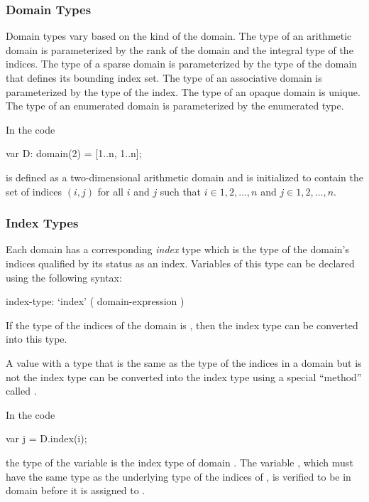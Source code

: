 \subsubsection{Domain Types}
\label{Domain_Types}

Domain types vary based on the kind of the domain.  The type of an
arithmetic domain is parameterized by the rank of the domain and the
integral type of the indices.  The type of a sparse domain is
parameterized by the type of the domain that defines its bounding
index set.  The type of an associative domain is parameterized by the
type of the index.  The type of an opaque domain is unique.  The type
of an enumerated domain is parameterized by the enumerated type.

\begin{example}
In the code
\begin{chapel}
var D: domain(2) = [1..n, 1..n];
\end{chapel}
 is defined as a two-dimensional arithmetic domain and is
initialized to contain the set of indices $(i,j)$ for all $i$ and $j$
such that $i \in {1, 2, \ldots, n}$ and $j \in {1, 2, \ldots, n}$.
\end{example}

\subsubsection{Index Types}
\label{Index_Types}

Each domain has a corresponding \emph{index} type which is the type of
the domain's indices qualified by its status as an index.  Variables
of this type can be declared using the following syntax:
\begin{syntax}
index-type:
  `index' ( domain-expression )
\end{syntax}
If the type of the indices of the domain is , then the index
type can be converted into this type.

A value with a type that is the same as the type of the indices in a
domain but is not the index type can be converted into the index type
using a special ``method'' called .

\begin{example}
In the code
\begin{chapel}
var j = D.index(i);
\end{chapel}
the type of the variable  is the index type of
domain .  The variable , which must have the same type
as the underlying type of the indices of , is verified to be
in domain  before it is assigned to .
\end{example}

